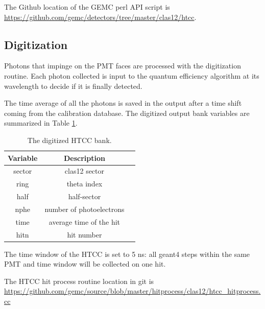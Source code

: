 The Github location of the GEMC perl API script is \url{https://github.com/gemc/detectors/tree/master/clas12/htcc}.



\subsection{Digitization}
Photons that impinge on the PMT faces are processed with the digitization routine.
Each photon collected is input to the quantum efficiency algorithm at its wavelength to decide if it is finally detected.

The time average of all the photons is saved in the output after a time shift coming from the calibration database.
The digitized output bank variables are summarized in Table \ref{tab:htccBank}.

\begin{table}[h]
	\begin{center}
		\begin{tabular}{| c | c | c |}
			\hline \hline
			Variable  & Description                         \\
			\hline
             sector   &                   clas12 sector     \\
             ring     &                     theta index     \\
             half     &                     half-sector     \\
             nphe     &        number of photoelectrons     \\
             time     &         average time of the hit     \\
             hitn     &                      hit number     \\
			\hline \hline
		\end{tabular}
	\end{center}
	\caption{The digitized HTCC bank.}\label{tab:htccBank}
\end{table}

The time window  of the HTCC is set to 5 ns: all geant4 steps within the same PMT and time window will be collected on one hit.


The HTCC hit process routine location in git is \url{https://github.com/gemc/source/blob/master/hitprocess/clas12/htcc_hitprocess.cc}
